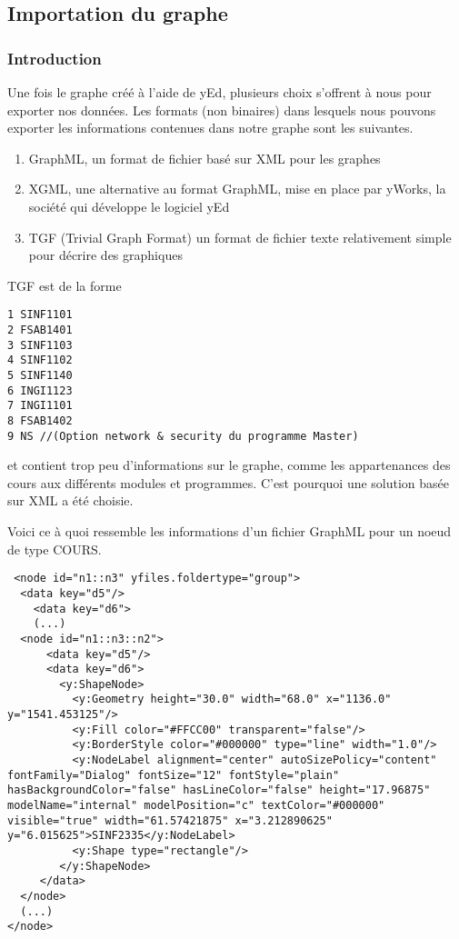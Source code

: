 \subsection{Importation du graphe}
\subsubsection{Introduction}
\label{graph_format_justification}
Une fois le graphe créé à l'aide de yEd, plusieurs choix s'offrent à nous pour exporter nos données. Les formats (non binaires) dans lesquels nous pouvons exporter les informations contenues dans notre graphe sont les suivantes. 
\begin{enumerate}
\item GraphML, un format de fichier basé sur XML pour les graphes
\item XGML, une alternative au format GraphML, mise en place par yWorks, la société qui développe le logiciel yEd
\item TGF (Trivial Graph Format) un format de fichier texte relativement simple pour décrire des graphiques
\end{enumerate}

TGF est de la forme

\begin{lstlisting}
1 SINF1101
2 FSAB1401
3 SINF1103
4 SINF1102
5 SINF1140
6 INGI1123
7 INGI1101
8 FSAB1402
9 NS //(Option network & security du programme Master)
\end{lstlisting}

et contient trop peu d'informations sur le graphe, comme les appartenances des cours aux différents modules et programmes. C'est pourquoi une solution basée sur XML a été choisie.

Voici ce à quoi ressemble les informations d'un fichier GraphML pour un noeud de type COURS.

\begin{lstlisting}
 <node id="n1::n3" yfiles.foldertype="group">
  <data key="d5"/>
    <data key="d6">
    (...)
  <node id="n1::n3::n2">
      <data key="d5"/>
      <data key="d6">
        <y:ShapeNode>
          <y:Geometry height="30.0" width="68.0" x="1136.0" y="1541.453125"/>
          <y:Fill color="#FFCC00" transparent="false"/>
          <y:BorderStyle color="#000000" type="line" width="1.0"/>
          <y:NodeLabel alignment="center" autoSizePolicy="content" fontFamily="Dialog" fontSize="12" fontStyle="plain" hasBackgroundColor="false" hasLineColor="false" height="17.96875" modelName="internal" modelPosition="c" textColor="#000000" visible="true" width="61.57421875" x="3.212890625" y="6.015625">SINF2335</y:NodeLabel>
          <y:Shape type="rectangle"/>
        </y:ShapeNode>
     </data>
  </node>
  (...)
</node>
\end{lstlisting}


